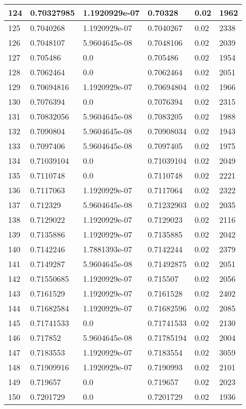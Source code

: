 \begin{longtable}{|l|l|l|l|l|l|}
124 & 0.70327985 & 1.1920929e-07 & 0.70328 & 0.02 & 1962 \\ \hline 
125 & 0.7040268 & 1.1920929e-07 & 0.7040267 & 0.02 & 2338 \\ \hline 
126 & 0.7048107 & 5.9604645e-08 & 0.7048106 & 0.02 & 2039 \\ \hline 
127 & 0.705486 & 0.0 & 0.705486 & 0.02 & 1954 \\ \hline 
128 & 0.7062464 & 0.0 & 0.7062464 & 0.02 & 2051 \\ \hline 
129 & 0.70694816 & 1.1920929e-07 & 0.70694804 & 0.02 & 1966 \\ \hline 
130 & 0.7076394 & 0.0 & 0.7076394 & 0.02 & 2315 \\ \hline 
131 & 0.70832056 & 5.9604645e-08 & 0.7083205 & 0.02 & 1988 \\ \hline 
132 & 0.7090804 & 5.9604645e-08 & 0.70908034 & 0.02 & 1943 \\ \hline 
133 & 0.7097406 & 5.9604645e-08 & 0.7097405 & 0.02 & 1975 \\ \hline 
134 & 0.71039104 & 0.0 & 0.71039104 & 0.02 & 2049 \\ \hline 
135 & 0.7110748 & 0.0 & 0.7110748 & 0.02 & 2221 \\ \hline 
136 & 0.7117063 & 1.1920929e-07 & 0.7117064 & 0.02 & 2322 \\ \hline 
137 & 0.712329 & 5.9604645e-08 & 0.71232903 & 0.02 & 2035 \\ \hline 
138 & 0.7129022 & 1.1920929e-07 & 0.7129023 & 0.02 & 2116 \\ \hline 
139 & 0.7135886 & 1.1920929e-07 & 0.7135885 & 0.02 & 2042 \\ \hline 
140 & 0.7142246 & 1.7881393e-07 & 0.7142244 & 0.02 & 2379 \\ \hline 
141 & 0.7149287 & 5.9604645e-08 & 0.71492875 & 0.02 & 2051 \\ \hline 
142 & 0.71550685 & 1.1920929e-07 & 0.715507 & 0.02 & 2056 \\ \hline 
143 & 0.7161529 & 1.1920929e-07 & 0.7161528 & 0.02 & 2402 \\ \hline 
144 & 0.71682584 & 1.1920929e-07 & 0.71682596 & 0.02 & 2085 \\ \hline 
145 & 0.71741533 & 0.0 & 0.71741533 & 0.02 & 2130 \\ \hline 
146 & 0.717852 & 5.9604645e-08 & 0.71785194 & 0.02 & 2004 \\ \hline 
147 & 0.7183553 & 1.1920929e-07 & 0.7183554 & 0.02 & 3059 \\ \hline 
148 & 0.71909916 & 1.1920929e-07 & 0.7190993 & 0.02 & 2101 \\ \hline 
149 & 0.719657 & 0.0 & 0.719657 & 0.02 & 2023 \\ \hline 
150 & 0.7201729 & 0.0 & 0.7201729 & 0.02 & 1936 \\ \hline 
\end{longtable}